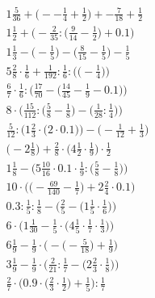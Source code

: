 \documentclass[8pt]{article}
\begin{document}
\begin{align}
1\frac{5}{36} + \big(--\frac{1}{4} + \frac{1}{2}\big) + -\frac{7}{18} + \frac{1}{2} \\
1\frac{1}{2} + \Big(-\frac{2}{35} : \big(\frac{9}{14} - \frac{1}{2}\big) + 0.1\Big) \\
1\frac{1}{3} - \big(-\frac{1}{5}\big) - \big(\frac{8}{15} - \frac{1}{5}\big) - \frac{1}{5} \\
5\frac{2}{8} \cdot \frac{1}{6} + \frac{1}{192} : \frac{1}{6} : \Big(\big(-\frac{1}{4}\big)\Big) \\
\frac{6}{7} \cdot \frac{1}{6} : \Big(\frac{17}{70} - \big(\frac{14}{45} - \frac{1}{9} - 0.1\big)\Big) \\
8 \cdot \Big(\frac{15}{112} : \big(\frac{5}{8} - \frac{1}{8}\big) - \big(\frac{1}{28} : \frac{1}{4}\big)\Big) \\
\frac{5}{12} : \Big(1\frac{2}{3} \cdot \big(2 \cdot 0.1\big)\Big) - \Big(-\frac{1}{12} + \frac{1}{3}\Big) \\
\big(-2\frac{1}{8}\big) + \frac{2}{8} \cdot \big(4\frac{1}{2} \cdot \frac{1}{9}\big) \cdot \frac{1}{2} \\
1\frac{1}{8} - \Big(5\frac{10}{16} \cdot 0.1 \cdot \frac{1}{9} : \big(\frac{5}{8} - \frac{1}{8}\big)\Big) \\
10 \cdot \Big(\big(-\frac{69}{140} - \frac{1}{7}\big) + 2\frac{2}{4} \cdot 0.1\Big) \\
0.3 : \frac{1}{5} : \frac{1}{8} - \Big(\frac{2}{5} - \big(1\frac{1}{5} \cdot \frac{1}{6}\big)\Big) \\
6 \cdot \Big(1\frac{1}{30} - \frac{1}{5} \cdot \big(4\frac{1}{5} \cdot \frac{1}{7} \cdot \frac{1}{3}\big)\Big) \\
6\frac{1}{9} - \frac{1}{9} \cdot \Big(-\big(-\frac{5}{18}\big) + \frac{1}{9}\Big) \\
3\frac{1}{9} - \frac{1}{9} \cdot \Big(\frac{2}{21} : \frac{1}{7} - \big(2\frac{2}{3} \cdot \frac{1}{8}\big)\Big) \\
\frac{2}{7} \cdot \Big(0.9 \cdot \big(\frac{2}{3} \cdot \frac{1}{2}\big) + \frac{1}{5}\Big) : \frac{1}{7}
\end{align}
\end{document}

